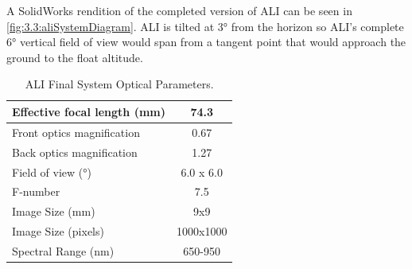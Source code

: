 \documentclass[12pt]{article}
\begin{document}

A SolidWorks rendition of the completed version of ALI can be seen in \autoref{fig:3.3:aliSystemDiagram}. ALI is tilted at 3\si{\degree} from the horizon so ALI's complete 6\si{\degree} vertical field of view would span from a tangent point that would approach the ground to the float altitude.

\begin{table}[!ht]
    \begin{center}
    \begin{tabular}{|l|c|}
      \hline
      Effective focal length (mm) & 74.3 \\
      \hline
      Front optics magnification & 0.67 \\
      \hline
      Back optics magnification & 1.27 \\
      \hline
      Field of view (\si{\degree}) & 6.0 x 6.0 \\
      \hline
      F-number & 7.5 \\
      \hline
      Image Size (mm) & 9x9\\
      \hline
      Image Size (pixels) & 1000x1000\\
      \hline
      Spectral Range (nm) & 650-950\\
      \hline
    \end{tabular}
    \end{center}
    \caption{ALI Final System Optical Parameters.}
    \label{tab:3.2:ALISystemParameters}
\end{table}
\end{document}
